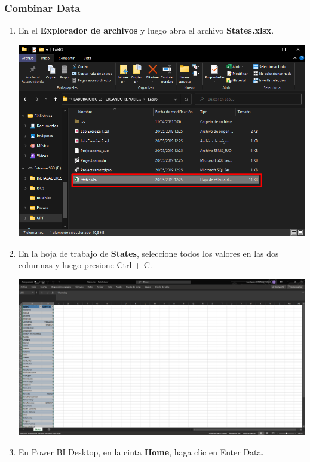 \documentclass[12pt,letterpaper]{article}
\newcommand\tab[1][1cm]{\hspace*{#1}}
\begin{document}
    \subsubsection{Combinar Data}
    \begin{enumerate}[\tab 1.]
        \item En el \textbf{Explorador de archivos} y luego abra el archivo \textbf{States.xlsx}.
        \begin{center}
            \includegraphics[width=13cm]{./img/img48.png}
        \end{center}
        \item En la hoja de trabajo de \textbf{States}, seleccione todos los valores en las dos columnas y luego presione Ctrl + C.
        \begin{center}
            \includegraphics[width=13cm]{./img/img49.png}
        \end{center}
        \item En Power BI Desktop, en la cinta \textbf{Home}, haga clic en Enter Data.
        \begin{center}

\end{center}
\end{enumerate}
\end{document}
